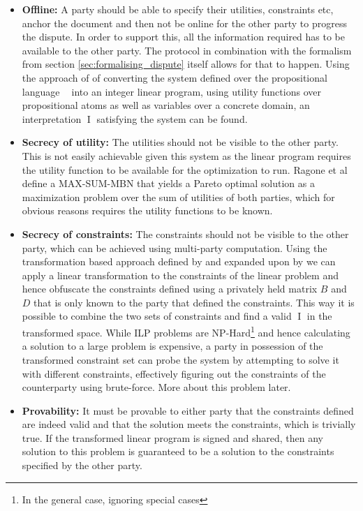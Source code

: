 \documentclass[12pt,msc,a4paper,oneside]{ucl_thesis}
\DeclareMathOperator{\Proplang}{\mathcal{L}(N)}
\DeclareMathOperator{\Interpretation}{I}
\begin{document}
\begin{itemize}
    \item\textbf{Offline:} A party should be able to specify their utilities, constraints etc, anchor the document and then not be online for the other party to progress the dispute. In order to support this, all the information required has to be available to the other party. The protocol in combination with the formalism from section \ref{sec:formalising_dispute} itself allows for that to happen. Using the approach of \cite{Ragone2008} of converting the system defined over the propositional language $\Proplang$ into an integer linear program, using utility functions over propositional atoms as well as variables over a concrete domain, an interpretation $\Interpretation$ satisfying the system can be found.

    \item\textbf{Secrecy of utility:} The utilities should not be visible to the other party. This is not easily achievable given this system as the linear program requires the utility function to be available for the optimization to run. Ragone et al \cite{Ragone2008} define a MAX-SUM-MBN that yields a Pareto optimal solution as a maximization problem over the sum of utilities of both parties, which for obvious reasons requires the utility functions to be known.

    \item\textbf{Secrecy of constraints:} The constraints should not be visible to the other party, which can be achieved using multi-party computation. Using the transformation based approach defined by \cite{Mangasarian2012} and expanded upon by \cite{Li2013} we can apply a linear transformation to the constraints of the linear problem and hence obfuscate the constraints defined using a privately held matrix $B$ and $D$ that is only known to the party that defined the constraints. This way it is possible to combine the two sets of constraints and find a valid $\Interpretation$ in the transformed space. While ILP problems are NP-Hard\footnote{In the general case, ignoring special cases} and hence calculating a solution to a large problem is expensive, a party in possession of the transformed constraint set can probe the system by attempting to solve it with different constraints, effectively figuring out the constraints of the counterparty using brute-force. More about this problem later.

    \item\textbf{Provability:} It must be provable to either party that the constraints defined are indeed valid and that the solution meets the constraints, which is trivially true. If the transformed linear program is signed and shared, then any solution to this problem is guaranteed to be a solution to the constraints specified by the other party.
\end{itemize}
\end{document}
